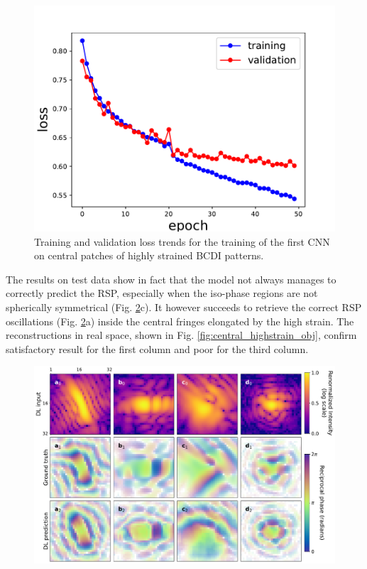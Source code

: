 \begin{figure}[H]
    \centering
    \includegraphics[width=\textwidth]{figures/Phasing/loss_central_patch_highstrain.pdf}
    \caption{Training and validation loss trends for the training of the first CNN on central patches of highly strained BCDI 
    patterns. }
    \label{fig:loss_central_highstrain}
\end{figure}

The results on test data show in fact that the model not always manages to correctly predict the RSP, especially when the 
iso-phase regions are not spherically symmetrical (Fig. \ref{fig:central_highstrain_RSP}c). It however succeeds to 
retrieve the correct RSP oscillations (Fig. \ref{fig:central_highstrain_RSP}a) inside the central fringes elongated by the
high strain. The reconstructions in real space, shown in Fig. \ref{fig:central_highstrain_obj}, confirm satisfactory 
result for the first column and poor for the third column. 

\begin{figure}[H]
    \centering
    \includegraphics[width=\textwidth]{figures/Phasing/central_patch_highstrain_RSP.pdf}
    \caption{}
    \label{fig:central_highstrain_RSP}
\end{figure}

